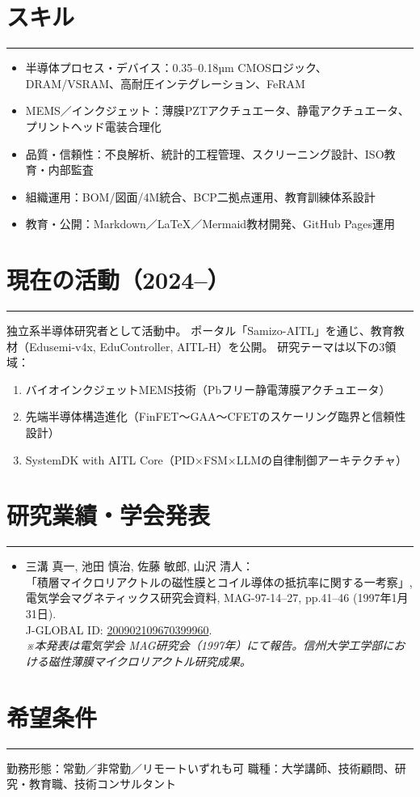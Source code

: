 \documentclass[lualatex,ja=standard,11pt]{bxjsarticle}
\newcommand{\cvsection}[1]{\section*{#1}\vspace{-0.3em}\hrule\vspace{0.5em}}
\begin{document}
\cvsection{スキル}
\begin{itemize}
  \item 半導体プロセス・デバイス：0.35–0.18µm CMOSロジック、DRAM/VSRAM、高耐圧インテグレーション、FeRAM
  \item MEMS／インクジェット：薄膜PZTアクチュエータ、静電アクチュエータ、プリントヘッド電装合理化
  \item 品質・信頼性：不良解析、統計的工程管理、スクリーニング設計、ISO教育・内部監査
  \item 組織運用：BOM/図面/4M統合、BCP二拠点運用、教育訓練体系設計
  \item 教育・公開：Markdown／LaTeX／Mermaid教材開発、GitHub Pages運用
\end{itemize}

\cvsection{現在の活動（2024–）}
独立系半導体研究者として活動中。  
ポータル「Samizo-AITL」を通じ、教育教材（Edusemi-v4x, EduController, AITL-H）を公開。  
研究テーマは以下の3領域：
\begin{enumerate}
  \item バイオインクジェットMEMS技術（Pbフリー静電薄膜アクチュエータ）
  \item 先端半導体構造進化（FinFET～GAA～CFETのスケーリング臨界と信頼性設計）
  \item SystemDK with AITL Core（PID×FSM×LLMの自律制御アーキテクチャ）
\end{enumerate}

\cvsection{研究業績・学会発表}
\begin{itemize}
  \item 三溝 真一, 池田 慎治, 佐藤 敏郎, 山沢 清人：\\
  「積層マイクロリアクトルの磁性膜とコイル導体の抵抗率に関する一考察」,\\
  電気学会マグネティックス研究会資料, MAG-97-14–27, pp.41–46 (1997年1月31日).\\
  J-GLOBAL ID: \href{https://jglobal.jst.go.jp/detail?JGLOBAL_ID=200902109670399960}{200902109670399960}.\\
  \textit{※本発表は電気学会 MAG研究会（1997年）にて報告。信州大学工学部における磁性薄膜マイクロリアクトル研究成果。}
\end{itemize}

\cvsection{希望条件}
勤務形態：常勤／非常勤／リモートいずれも可  
職種：大学講師、技術顧問、研究・教育職、技術コンサルタント
\end{document}
